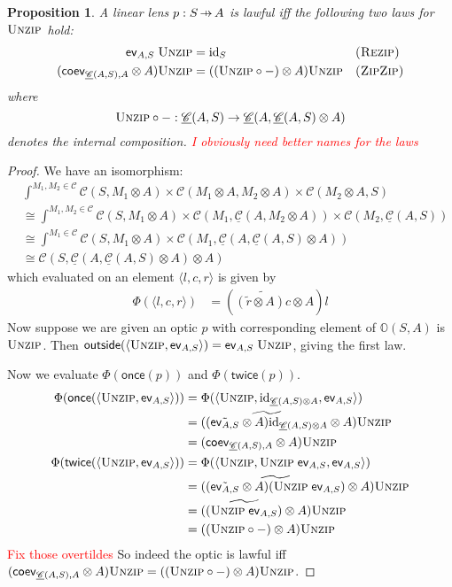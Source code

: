 \documentclass[11pt,a4paper]{article}
\theoremstyle{plain}
\newtheorem{proposition}[theorem]{Proposition}
\theoremstyle{definition}
\newcommand{\C}{\mathscr{C}}
\newcommand{\homC}{\underline{\C}}
\newcommand{\id}{\mathrm{id}}
\newcommand{\funzip}{\textsc{Unzip}}
\newcommand{\outside}{\mathsf{outside}}
\newcommand{\once}{\mathsf{once}}
\newcommand{\twice}{\mathsf{twice}}
\newcommand{\hto}{\ensuremath{\,\mathaccent\shortmid\rightarrow\,}}
\newcommand{\todo}[1]{\textcolor{red}{\small #1}}
\begin{document}
\begin{proposition}
A linear lens $p : S \hto A$ is lawful iff the following two laws for $\funzip$ hold:
\begin{align*}
\ev_{A, S} \; \funzip &= \id_S && \textsc{(Rezip)} \\
(\coev_{\homC(A, S), A} \otimes A)\funzip &= ((\funzip \circ -) \otimes A)\funzip && \textsc{(ZipZip)} 
\end{align*}
where \[ \funzip \circ - : \homC(A, S) \to \homC(A, \homC(A, S) \otimes A) \] denotes the internal composition. \todo{I obviously need better names for the laws}
\end{proposition}
\begin{proof}
We have an isomorphism:
\begin{align*}
& \int^{M_1, M_2 \in \C} \C(S, M_1 \otimes A) \times \C(M_1 \otimes A, M_2 \otimes A) \times \C(M_2 \otimes A, S) \\
&\cong \int^{M_1, M_2 \in \C} \C(S, M_1 \otimes A) \times \C(M_1, \homC(A, M_2 \otimes A)) \times \C(M_2, \homC(A, S)) \\
&\cong \int^{M_1 \in \C} \C(S, M_1 \otimes A) \times \C(M_1, \homC(A, \homC(A, S) \otimes A)) \\
&\cong \C(S, \homC(A, \homC(A, S) \otimes A) \otimes A)
\end{align*}
which evaluated on an element $\langle l, c, r \rangle$ is given by
\begin{align*}
\Phi(\langle l, c, r \rangle) &= (\widetilde{(\tilde{r} \otimes A)c} \otimes A)l
\end{align*}
Now suppose we are given an optic $p$ with corresponding element of $\mathbb{O}(S, A)$ is $\funzip$. Then $\outside(\langle \funzip , \ev_{A, S} \rangle) = \ev_{A, S} \; \funzip$, giving the first law.

Now we evaluate $\Phi(\once(p))$ and $\Phi(\twice(p))$.
\begin{align*}
\Phi(\once(\langle \funzip , \ev_{A, S} \rangle)) 
&= \Phi(\langle \funzip , \id_{\homC(A,S) \otimes A}, \ev_{A, S} \rangle) \\
&= (\widetilde{(\tilde{\ev_{A, S}} \otimes A)\id_{\homC(A,S) \otimes A}} \otimes A)\funzip \\
&= (\coev_{\homC(A, S), A} \otimes A)\funzip \\
\Phi(\twice(\langle \funzip , \ev_{A, S} \rangle)) 
&= \Phi(\langle \funzip , \funzip \; \ev_{A, S}, \ev_{A, S} \rangle) \\
&= (\widetilde{(\tilde{\ev_{A, S}} \otimes A)(\funzip \; \ev_{A, S})} \otimes A)\funzip \\
&= (\widetilde{(\funzip \; \ev_{A, S})} \otimes A)\funzip \\
&= ((\funzip \circ -) \otimes A)\funzip
\end{align*}
\todo{Fix those overtildes}
So indeed the optic is lawful iff $(\coev_{\homC(A, S), A} \otimes A)\funzip = ((\funzip \circ -) \otimes A)\funzip$.
\end{proof}
\end{document}
